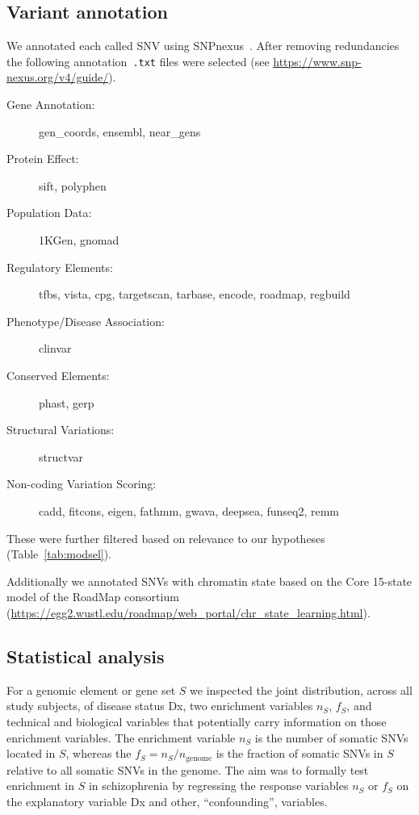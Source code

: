 \documentclass[letterpaper]{article}
\begin{document}
\subsection*{Variant annotation}

We annotated each called SNV using SNPnexus~\citep{Oscanoa2020}.  After
removing redundancies the following annotation~\texttt{.txt} files were
selected (see \url{https://www.snp-nexus.org/v4/guide/}).

\begin{description}
\item[Gene Annotation:] gen\_coords, ensembl, near\_gens
\item[Protein Effect:] sift, polyphen
\item[Population Data:] 1KGen, gnomad
\item[Regulatory Elements:] tfbs, vista, cpg, targetscan, tarbase, encode, roadmap, regbuild
\item[Phenotype/Disease Association:] clinvar
\item[Conserved Elements:] phast, gerp
\item[Structural Variations:] structvar
\item[Non-coding Variation Scoring:] cadd, fitcons, eigen, fathmm, gwava, deepsea, funseq2, remm
\end{description}

These were further filtered based on relevance to our
hypotheses (Table~\ref{tab:modsel}).

Additionally we annotated SNVs with chromatin state based on the 
Core 15-state model of the RoadMap consortium
(\url{https://egg2.wustl.edu/roadmap/web\_portal/chr\_state\_learning.html}).

\subsection*{Statistical analysis}

For a genomic element or gene set  \(S\) we inspected the joint distribution,
across all study subjects, of disease status Dx, two enrichment variables
\(n_S\), \(f_S\), and technical and biological variables that potentially
carry information on those enrichment variables.  The enrichment variable
\(n_S\) is the number of somatic SNVs located in \(S\), whereas the \(f_S =
	n_S/n_\mathrm{genome}\) is the fraction of somatic SNVs in \(S\)
relative to all somatic SNVs in the genome.  The aim was to formally test
enrichment in \(S\) in schizophrenia by regressing the response variables
\(n_S\) or \(f_S\) on the explanatory variable Dx
and other, ``confounding'', variables.
\end{document}
